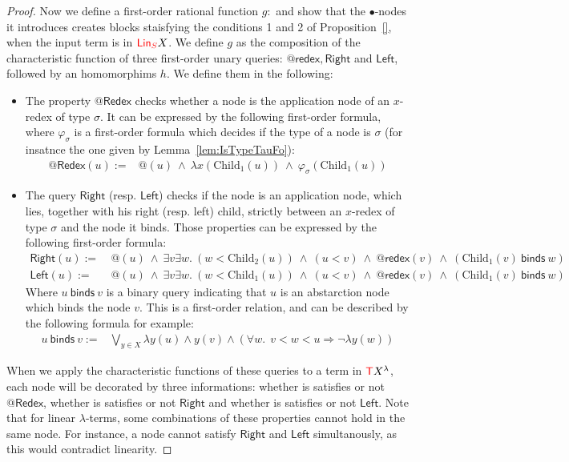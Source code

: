 \begin{proof}
Now we define a first-order rational function $g:$ and show that the $\bullet$-nodes it introduces creates blocks staisfying the conditions 1 and 2 of Proposition~\ref{}, when the input term is in ${\color{red}{\mathsf{Lin}_{S}}} X$.  
We define $g$ as the composition of the characteristic function of three first-order unary queries: $\mathsf{@redex}, \mathsf{Right}$ and $\mathsf{Left}$, followed by an homomorphims $h$. We define them in the following:
\begin{itemize}
\item The property $\mathsf{@Redex}$ checks whether a node is the application node of an $x$-redex of type $\sigma$. It can be expressed by the following first-order formula, where  $\varphi_\sigma$ is a first-order formula which decides if the type of a node is $\sigma$ (for insatnce the one given by Lemma~\ref{lem:IsTypeTauFo}):
\begin{align*} \mathsf{@Redex}( u ):=& \mathsf{@}(u)\ \wedge\ \lambda x(\mathrm{Child}_1(u))\ \wedge\ \varphi_\sigma(\mathrm{Child}_1(u))
\end{align*} 
\item The query $\mathsf{Right}$ (resp. $\mathsf{Left}$) checks if the node is an application node, which lies, together with his right (resp. left) child, strictly between an $x$-redex of type $\sigma$ and the node it binds. Those properties can be expressed by the following first-order formula:
\begin{align*}
\mathsf{Right}( u ):=&\ @(u)\ \wedge\ \exists v\exists w . \ (w< \mathrm{Child}_2(u))\ \wedge\ (u< v)\ \wedge \ \mathsf{@ redex}(v) \ \wedge\ (\mathrm{Child}_1(v)\ \mathsf{binds}\ w)\\
\mathsf{Left}( u ):=&\ @(u)\ \wedge\  \exists v\exists w . \ (w< \mathrm{Child}_1(u))\ \wedge\ (u< v)\ \wedge \ \mathsf{@ redex}(v) \ \wedge\ (\mathrm{Child}_1(v)\ \mathsf{binds}\ w)
\end{align*} 
Where $u\ \mathsf{binds} \ v$ is a binary query indicating that $u$ is an abstarction node which binds the node $v$. This is a first-order relation, and can be described by the following formula for example:
\begin{align*}
 u\ \mathsf{binds}\ v :=&\bigvee_{y\in X} \lambda y(u) \wedge y(v) \wedge (\forall w. \ \ v< w< u\Rightarrow \neg \lambda y(w))
 \end{align*}
\end{itemize}

When we apply the characteristic functions of these queries to a term in ${\color{red}{\mathsf T}} X^\lambda$, each node will be decorated by three informations: whether is satisfies or not $\mathsf{@Redex}$,  whether is satisfies or not $\mathsf{Right}$ and whether is satisfies or not $\mathsf{Left}$. Note that for linear $\lambda$-terms, some combinations of these properties cannot hold in the same node. For instance, a node cannot satisfy $\mathsf{Right}$ and $\mathsf{Left}$ simultanously, as this would contradict linearity. 


\end{proof}
